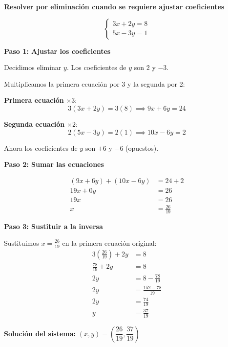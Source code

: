 \begin{example}
\textbf{Resolver por eliminación cuando se requiere ajustar coeficientes}

$$\begin{cases}
3x + 2y = 8 \\
5x - 3y = 1
\end{cases}$$

\textbf{Paso 1: Ajustar los coeficientes}

Decidimos eliminar $y$. Los coeficientes de $y$ son 2 y $-3$.

Multiplicamos la primera ecuación por 3 y la segunda por 2:

\textbf{Primera ecuación} $\times 3$:
$$3(3x + 2y) = 3(8) \implies 9x + 6y = 24$$

\textbf{Segunda ecuación} $\times 2$:
$$2(5x - 3y) = 2(1) \implies 10x - 6y = 2$$

Ahora los coeficientes de $y$ son $+6$ y $-6$ (opuestos).

\textbf{Paso 2: Sumar las ecuaciones}

\begin{align*}
(9x + 6y) + (10x - 6y) &= 24 + 2 \\
19x + 0y &= 26 \\
19x &= 26 \\
x &= \frac{26}{19}
\end{align*}

\textbf{Paso 3: Sustituir a la inversa}

Sustituimos $x = \frac{26}{19}$ en la primera ecuación original:
\begin{align*}
3\left(\frac{26}{19}\right) + 2y &= 8 \\
\frac{78}{19} + 2y &= 8 \\
2y &= 8 - \frac{78}{19} \\
2y &= \frac{152 - 78}{19} \\
2y &= \frac{74}{19} \\
y &= \frac{37}{19}
\end{align*}

\textbf{Solución del sistema:} $(x, y) = \left(\dfrac{26}{19}, \dfrac{37}{19}\right)$
\end{example}

\newpage


